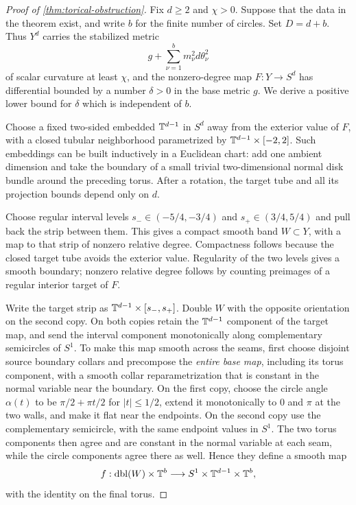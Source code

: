 \begin{proof}[Proof of \cref{thm:torical-obstruction}]
Fix $d\ge2$ and $\chi>0$. Suppose that the data in the theorem exist,
and write $b$ for the finite number of circles. Set $D=d+b$.
Thus $Y^d$ carries the stabilized metric
\[
 g+\sum_{\nu=1}^b m_\nu^2d\theta_\nu^2
\]
of scalar curvature at least $\chi$, and the nonzero-degree map
$F:Y\to S^d$ has differential bounded by a number $\delta>0$ in the
base metric $g$. We derive a positive lower bound for $\delta$ which
is independent of $b$.

Choose a fixed two-sided embedded $\mathbb T^{d-1}$ in $S^d$ away from the exterior
value of $F$, with a closed tubular neighborhood parametrized by
$\mathbb T^{d-1}\times[-2,2]$. Such embeddings can be built inductively in a
Euclidean chart: add one ambient dimension and take the boundary of a small
trivial two-dimensional normal disk bundle around the preceding torus.
After a rotation, the target tube and all its projection bounds depend only
on $d$.

Choose regular interval levels
$s_-\in(-5/4,-3/4)$ and $s_+\in(3/4,5/4)$ and pull back the strip
between them. This gives a compact smooth band $W\subset Y$, with a
map to that strip of nonzero relative degree. Compactness follows because
the closed target tube avoids the exterior value. Regularity of the two
levels gives a smooth boundary; nonzero relative degree follows by
counting preimages of a regular interior target of $F$.

Write the target strip as $\mathbb T^{d-1}\times[s_-,s_+]$. Double
$W$ with the opposite orientation on the second copy. On both copies
retain the $\mathbb T^{d-1}$ component of the target map, and send the interval
component monotonically along complementary semicircles of $S^1$.
To make this map smooth across the seams, first choose disjoint source
boundary collars and precompose the \emph{entire base map}, including its
torus component, with a smooth collar reparametrization that is constant
in the normal variable near the boundary. On the first copy, choose the circle angle $\alpha(t)$ to be
$\pi/2+\pi t/2$ for $|t|\le1/2$, extend it monotonically to $0$ and
$\pi$ at the two walls, and make it flat near the endpoints. On the
second copy use the complementary semicircle, with the same endpoint
values in $S^1$. The two torus components then
agree and are constant in the normal variable at each seam, while the
circle components agree there as well. Hence they define a smooth map
\[
 f:\operatorname{dbl}(W)\times\mathbb T^b
       \longrightarrow S^1\times\mathbb T^{d-1}\times\mathbb T^b,
\]
with the identity on the final torus.


\end{proof}
